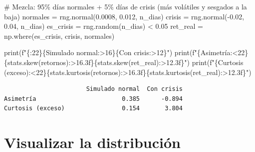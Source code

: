 \documentclass[
  spanish,
  letterpaper,
  DIV=11,
  numbers=noendperiod]{scrreprt}
\newenvironment{Shaded}{\begin{snugshade}}{\end{snugshade}}
\newcommand{\BuiltInTok}[1]{\textcolor[rgb]{0.00,0.23,0.31}{#1}}
\newcommand{\CommentTok}[1]{\textcolor[rgb]{0.37,0.37,0.37}{#1}}
\newcommand{\FloatTok}[1]{\textcolor[rgb]{0.68,0.00,0.00}{#1}}
\newcommand{\NormalTok}[1]{\textcolor[rgb]{0.00,0.23,0.31}{#1}}
\newcommand{\OperatorTok}[1]{\textcolor[rgb]{0.37,0.37,0.37}{#1}}
\newcommand{\SpecialCharTok}[1]{\textcolor[rgb]{0.37,0.37,0.37}{#1}}
\newcommand{\SpecialStringTok}[1]{\textcolor[rgb]{0.13,0.47,0.30}{#1}}
\newcommand{\StringTok}[1]{\textcolor[rgb]{0.13,0.47,0.30}{#1}}
\begin{document}
\label{retornos-realistas}
\begin{Shaded}
\begin{Highlighting}[]
\CommentTok{\# Mezcla: 95\% días normales + 5\% días de crisis (más volátiles y sesgados a la baja)}
\NormalTok{normales }\OperatorTok{=}\NormalTok{ rng.normal(}\FloatTok{0.0008}\NormalTok{, }\FloatTok{0.012}\NormalTok{, n\_dias)}
\NormalTok{crisis }\OperatorTok{=}\NormalTok{ rng.normal(}\OperatorTok{{-}}\FloatTok{0.02}\NormalTok{, }\FloatTok{0.04}\NormalTok{, n\_dias)}
\NormalTok{es\_crisis }\OperatorTok{=}\NormalTok{ rng.random(n\_dias) }\OperatorTok{\textless{}} \FloatTok{0.05}
\NormalTok{ret\_real }\OperatorTok{=}\NormalTok{ np.where(es\_crisis, crisis, normales)}

\BuiltInTok{print}\NormalTok{(}\SpecialStringTok{f"}\SpecialCharTok{\{}\StringTok{\textquotesingle{}\textquotesingle{}}\SpecialCharTok{:22\}\{}\StringTok{\textquotesingle{}Simulado normal\textquotesingle{}}\SpecialCharTok{:\textgreater{}16\}\{}\StringTok{\textquotesingle{}Con crisis\textquotesingle{}}\SpecialCharTok{:\textgreater{}12\}}\SpecialStringTok{"}\NormalTok{)}
\BuiltInTok{print}\NormalTok{(}\SpecialStringTok{f"}\SpecialCharTok{\{}\StringTok{\textquotesingle{}Asimetría\textquotesingle{}}\SpecialCharTok{:\textless{}22\}\{}\NormalTok{stats}\SpecialCharTok{.}\NormalTok{skew(retornos)}\SpecialCharTok{:\textgreater{}16.3f\}\{}\NormalTok{stats}\SpecialCharTok{.}\NormalTok{skew(ret\_real)}\SpecialCharTok{:\textgreater{}12.3f\}}\SpecialStringTok{"}\NormalTok{)}
\BuiltInTok{print}\NormalTok{(}\SpecialStringTok{f"}\SpecialCharTok{\{}\StringTok{\textquotesingle{}Curtosis (exceso)\textquotesingle{}}\SpecialCharTok{:\textless{}22\}\{}\NormalTok{stats}\SpecialCharTok{.}\NormalTok{kurtosis(retornos)}\SpecialCharTok{:\textgreater{}16.3f\}\{}\NormalTok{stats}\SpecialCharTok{.}\NormalTok{kurtosis(ret\_real)}\SpecialCharTok{:\textgreater{}12.3f\}}\SpecialStringTok{"}\NormalTok{)}
\end{Highlighting}
\end{Shaded}

\begin{verbatim}
                       Simulado normal  Con crisis
Asimetría                        0.385      -0.894
Curtosis (exceso)                0.154       3.804
\end{verbatim}

\section{Visualizar la
distribución}\label{visualizar-la-distribuciuxf3n}
\end{document}
